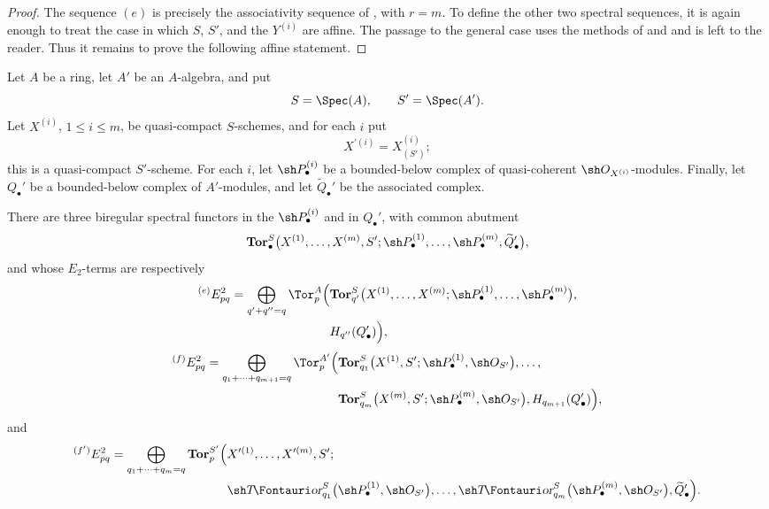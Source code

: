 
\begin{proof}
The sequence $(e)$ is precisely the associativity sequence of
, with $r=m$.  To define the other two spectral
sequences, it is again enough to treat the case in which $S$, $S'$,
and the $Y^{(i)}$ are affine.  The passage to the general case uses
the methods of  and  and is left to
the reader.  Thus it remains to prove the following affine
statement.
\end{proof}

\begin{corollary}[6.9.4]
\label{III.6.9.4}
Let $A$ be a ring, let $A'$ be an $A$-algebra, and put
\[
  S=\Spec(A),
  \qquad
  S'=\Spec(A').
\]
Let $X^{(i)}$, $1\leq i\leq m$, be quasi-compact $S$-schemes, and
for each $i$ put
\[
  X^{\prime(i)}=X_{(S')}^{(i)};
\]
this is a quasi-compact $S'$-scheme.  For each $i$, let
$\sh P_\bullet^{(i)}$ be a bounded-below complex of quasi-coherent
$\sh O_{X^{(i)}}$-modules.  Finally, let $Q_\bullet'$ be a
bounded-below complex of $A'$-modules, and let
$\widetilde Q_\bullet'$ be the associated complex.

There are three biregular spectral functors in the
$\sh P_\bullet^{(i)}$ and in $Q_\bullet'$, with common abutment
\[
  \mathbf{Tor}_\bullet^S
  \bigl(
    X^{(1)},\ldots,X^{(m)},S';
    \sh P_\bullet^{(1)},\ldots,\sh P_\bullet^{(m)},
    \widetilde Q_\bullet'
  \bigr),
\]
and whose $E_2$-terms are respectively
\[
\begin{split}
  {}^{(e)}E_{pq}^2
  =
  \bigoplus_{q'+q''=q}
  \Tor_p^A
  \Bigl(
    &
    \mathbf{Tor}_{q'}^S
    \bigl(
      X^{(1)},\ldots,X^{(m)};
      \sh P_\bullet^{(1)},\ldots,\sh P_\bullet^{(m)}
    \bigr),
    \\
    &
    H_{q''}(Q_\bullet')
  \Bigr),
\end{split}
\]
\[
\begin{split}
  {}^{(f)}E_{pq}^2
  =
  \bigoplus_{q_1+\cdots+q_{m+1}=q}
  \Tor_p^{A'}
  \Bigl(
    &
    \mathbf{Tor}_{q_1}^S
    \bigl(
      X^{(1)},S';
      \sh P_\bullet^{(1)},\sh O_{S'}
    \bigr),
    \ldots,
    \\
    &
    \mathbf{Tor}_{q_m}^S
    \bigl(
      X^{(m)},S';
      \sh P_\bullet^{(m)},\sh O_{S'}
    \bigr),
    H_{q_{m+1}}(Q_\bullet')
  \Bigr),
\end{split}
\]
and
\[
\begin{split}
  {}^{(f')}E_{pq}^2
  =
  \bigoplus_{q_1+\cdots+q_m=q}
  \mathbf{Tor}_p^{S'}
  \Bigl(
    &
    X^{\prime(1)},\ldots,X^{\prime(m)},S';
    \\
    &
    \shTor_{q_1}^S
    \bigl(
      \sh P_\bullet^{(1)},\sh O_{S'}
    \bigr),
    \ldots,
    \shTor_{q_m}^S
    \bigl(
      \sh P_\bullet^{(m)},\sh O_{S'}
    \bigr),
    \widetilde Q_\bullet'
  \Bigr).
\end{split}
\]
\end{corollary}


